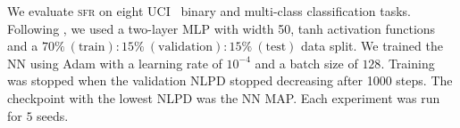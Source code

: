 \documentclass{article}
\newcommand{\our}{\textsc{sfr}\xspace}
\begin{document}

%

%
We evaluate \our on eight UCI~\citep{UCI} binary and multi-class classification tasks.
Following \citet{immer2021improving}, we used a two-layer MLP with width 50, tanh activation functions and a
$70\%\ (\text{train}):15\%\ (\text{validation}) :15\%\ (\text{test})$ data split.
We trained the NN using Adam \cite{adam} with a learning rate of $10^{-4}$ and a batch size of $128$.
Training was stopped when the validation NLPD stopped decreasing after 1000 steps.
The checkpoint with the lowest NLPD was the NN MAP.
Each experiment was run for $5$ seeds.
\end{document}
